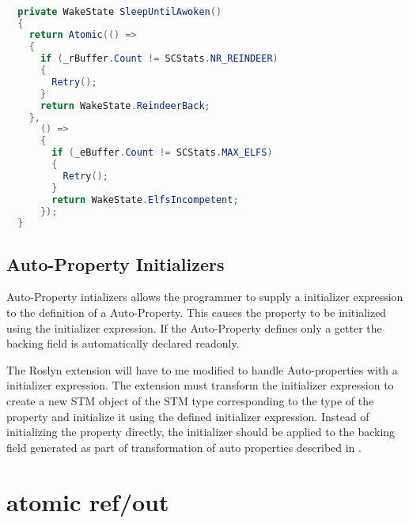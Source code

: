 \begin{lstlisting}[float,label=lst:static_using_example,
  caption={\ac{STM} library with static using statement},
  language=Java,  
  showspaces=false,
  showtabs=false,
  breaklines=true,
  showstringspaces=false,
  breakatwhitespace=true,
  escapechar=~,
  commentstyle=\color{greencomments},
  keywordstyle=\color{bluekeywords},
  stringstyle=\color{redstrings},
  morekeywords={atomic, retry, orelse, var, get, set, ref, out}]  % Start your code-block

  private WakeState SleepUntilAwoken()
  {
    return Atomic(() =>
    {
      if (_rBuffer.Count != SCStats.NR_REINDEER)
      {
        Retry();
      }
      return WakeState.ReindeerBack;
    },
      () =>
      {
        if (_eBuffer.Count != SCStats.MAX_ELFS)
        {
          Retry();
        }
        return WakeState.ElfsIncompetent;
      });
  }
\end{lstlisting}

\subsection{Auto-Property Initializers}
Auto-Property intializers allows the programmer to supply a initializer expression to the definition of a Auto-Property\cite{csharp6one}\cite{csharp6two}\cite{csharp6featureDescription}. This causes the property  to be initialized using the initializer expression. If the Auto-Property defines only a getter the backing field is automatically declared readonly\cite{csharp6one}\cite{csharp6featureDescription}. 

The Roslyn extension will have to me modified to handle  Auto-properties with a initializer expression. The extension must transform the initializer expression to create a new \ac{STM} object of the \ac{STM} type corresponding to the type of the  property and initialize it using the defined initializer expression. Instead of initializing the property directly, the initializer should be applied to the backing field generated as part of transformation of  auto properties described in .

\section{atomic ref/out}
\worksheetend
